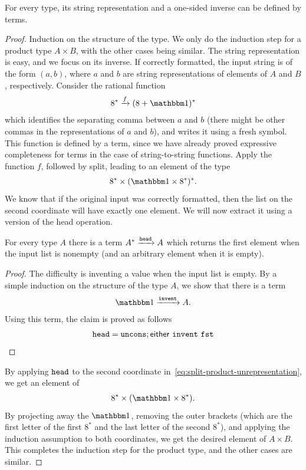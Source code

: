 \begin{lemma}\label{lem:terms-define-string-representation}
    For every type, its string representation and a one-sided inverse  can be defined by terms.
\end{lemma}
\begin{proof}
    Induction on the structure of the type. We only do the induction step for a product type $A \times B$, with the other cases being similar. The string representation is easy, and we focus on its inverse. If correctly formatted, the input string is of the form $(a,b)$, where $a$ and $b$ are string representations of elements of $A$ and $B$, respectively. Consider the rational function 
    \begin{align*}
    8^* \xrightarrow f (8 + \onetype)^*
    \end{align*}
    which identifies the separating comma between $a$ and $b$ (there might be other commas in the representations of $a$ and $b$), and writes it using a fresh symbol. This function is defined by a term, since we have already proved expressive completeness for terms in the case of string-to-string functions. Apply the function $f$, followed by split, leading to an element of the type
\begin{align}\label{eq:split-product-unrepresentation}
    8^* \times (\onetype \times 8^*)^*.
\end{align}
We know that if the original input was correctly formatted, then the list on the second coordinate will have exactly one element. We will now extract it using a version of the head operation.
\begin{claim}
    \label{claim:head}
    For every type $A$ there is a term  $A^* \xrightarrow {\mathtt{head}} A$ which returns the first element when the input list is nonempty (and an arbitrary element when it is empty). 
\end{claim}
\begin{proof}
    The difficulty is inventing a value when the input list is empty. By a simple induction on the structure of the type $A$, we show that there is a term
    \begin{align*}
    \onetype \xrightarrow{\inventterm} A.
    \end{align*}
    Using this term, the claim is proved as follows
    \begin{align*}
   \mathtt{head} =  \mathtt{uncons}; \mathsf{either}\ \mathtt{invent}\ \mathtt{fst}
    \end{align*}
\end{proof}
By applying $\mathtt{head}$  to the second coordinate in~\eqref{eq:split-product-unrepresentation}, we get an element of 
\begin{align*}
8^* \times (\onetype \times 8^*).
\end{align*}
By projecting away the $\onetype$, removing the outer brackets (which are the first letter of the first $8^*$ and the last letter of the second $8^*$), and applying the induction assumption to both coordinates, we get the desired element of $A \times B$. This completes the induction step for the product type, and the other cases are similar.
\end{proof}


